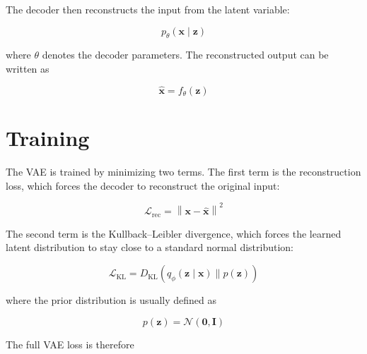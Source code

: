 \documentclass[a4paper]{article}
\begin{document}
        The decoder then reconstructs the input from the latent variable:
        
        \begin{equation}
            p_{\theta}(\mathbf{x} \mid \mathbf{z})
        \end{equation}
        
        where $\theta$ denotes the decoder parameters. The reconstructed output can be written as
        
        \begin{equation}
            \hat{\mathbf{x}}
            =
            f_{\theta}(\mathbf{z})
        \end{equation}
    
    
    \section{Training}
        The VAE is trained by minimizing two terms. The first term is the reconstruction loss, which forces the decoder to reconstruct the original input:
        
        \begin{equation}
            \mathcal{L}_{\mathrm{rec}}
            =
            \left\|
                \mathbf{x}
                -
                \hat{\mathbf{x}}
            \right\|^{2}
        \end{equation}
        
        The second term is the Kullback--Leibler divergence, which forces the learned latent distribution to stay close to a standard normal distribution:
        
        \begin{equation}
            \mathcal{L}_{\mathrm{KL}}
            =
            D_{\mathrm{KL}}
            \left(
                q_{\phi}(\mathbf{z} \mid \mathbf{x})
                \parallel
                p(\mathbf{z})
            \right)
        \end{equation}
        
        where the prior distribution is usually defined as
        
        \begin{equation}
            p(\mathbf{z})
            =
            \mathcal{N}
            \left(
                \mathbf{0},
                \mathbf{I}
            \right)
        \end{equation}
        
        The full VAE loss is therefore
        
\end{document}
